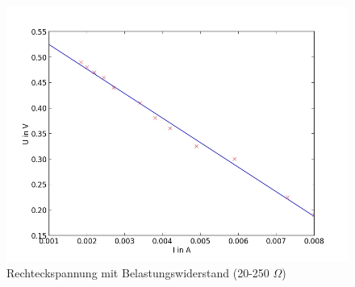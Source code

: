 	\begin{figure}[h]
		\begin{center}
		\includegraphics[scale=0.5]{picdr.jpg}
		\caption{Rechteckspannung mit Belastungswiderstand (20-250 $\Omega$)}
		\label{picdr}
		\end{center}	
	\end{figure}